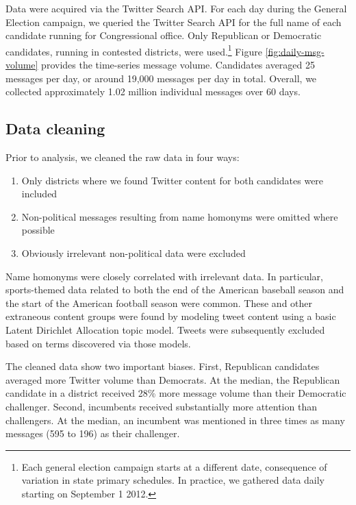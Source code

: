 \documentclass[11pt]{article}
\begin{document}
Data were acquired via the Twitter Search API. For each day during the
General Election campaign, we queried the Twitter Search API for the
full name of each candidate running for Congressional
office. Only Republican or Democratic candidates, running in contested
districts, were used.\footnote{Each general election campaign starts at a different
date, consequence of variation in state primary schedules. In
practice, we gathered data daily starting on September 1 2012.} Figure
\ref{fig:daily-msg-volume} provides the time-series message
volume. Candidates averaged 25 messages per day, or around 19,000
messages per day in total. Overall, we collected approximately 1.02
million individual messages over 60 days.

\subsection{Data cleaning}
\label{sec:data-cleaning}

Prior to analysis, we cleaned the raw data in four ways:
\begin{enumerate}
\item Only districts where we found Twitter content for both
  candidates were included
\item Non-political messages resulting from name homonyms were omitted where possible
\item Obviously irrelevant non-political data were excluded
\end{enumerate}

Name homonyms were closely correlated with irrelevant data. In
particular, sports-themed data related to both the end of the American
baseball season and the start of the American football season were
common. These and other extraneous content groups were found by
modeling tweet content using a basic Latent Dirichlet Allocation topic
model. Tweets were subsequently excluded based on terms discovered via
those models.

The cleaned data show two important biases. First, Republican
candidates averaged more Twitter volume than Democrats. At the median,
the Republican candidate in a district received 28\% more message
volume than their Democratic challenger. Second, incumbents received
substantially more attention than challengers. At the median, an
incumbent was mentioned in three times as many messages (595 to 196)
as their challenger.



\end{document}
